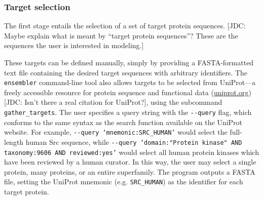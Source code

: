 \documentclass[aps,pre,twocolumn,nofootinbib,superscriptaddress,linenumbers]{revtex4-1}
\begin{document}
\subsubsection{Target selection}

The first stage entails the selection of a set of target protein sequences.
{\color{red}[JDC: Maybe explain what is meant by ``target protein sequences''?  These are the sequences the user is interested in modeling.]}

These targets can be defined manually, simply by providing a FASTA-formatted text file containing the desired target sequences with arbitrary identifiers.
The {\tt ensembler} command-line tool also allows targets to be selected from UniProt---a freely accessible resource for protein sequence and functional data (\href{http://www.uniprot.org/}{uniprot.org}) {\color{red}[JDC: Isn't there a real citation for UniProt?]}, using the subcommand {\tt gather\_targets}.
The user specifies a query string with the {\tt -{}-query} flag, which conforms to the same syntax as the search function available on the UniProt website.
For example, {\tt -{}-query `mnemonic:SRC\_HUMAN'} would select the full-length human Src sequence, while {\tt -{}-query `domain:"Protein kinase" AND taxonomy:9606 AND reviewed:yes'} would select all human protein kinases which have been reviewed by a human curator.
In this way, the user may select a single protein, many proteins, or an entire superfamily.
The program outputs a FASTA file, setting the UniProt mnemonic (e.g. {\tt SRC\_HUMAN}) as the identifier for each target protein.
\end{document}
